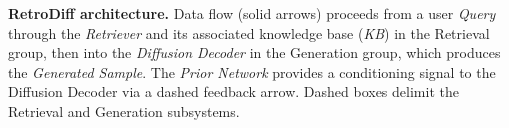 \caption{\textbf{RetroDiff architecture.} Data flow (solid arrows) proceeds from a user \emph{Query} through the \emph{Retriever} and its associated knowledge base (\emph{KB}) in the Retrieval group, then into the \emph{Diffusion Decoder} in the Generation group, which produces the \emph{Generated Sample}. The \emph{Prior Network} provides a conditioning signal to the Diffusion Decoder via a dashed feedback arrow. Dashed boxes delimit the Retrieval and Generation subsystems.}
